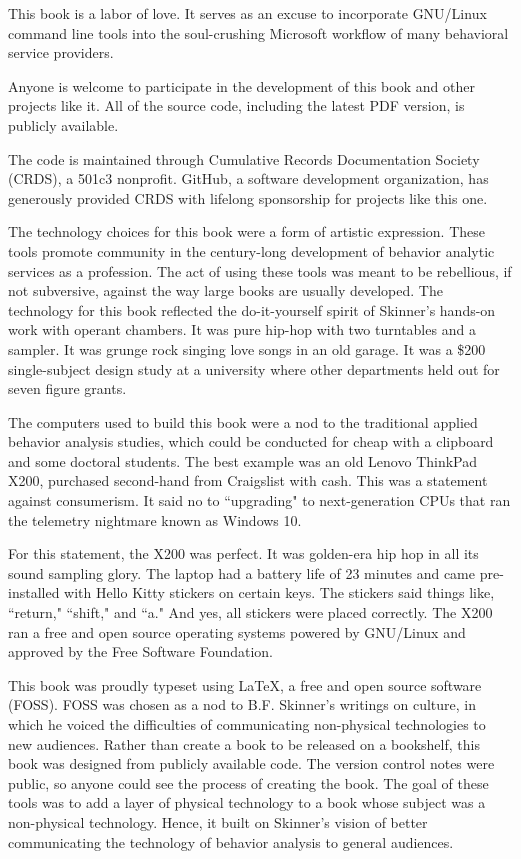 This book is a labor of love. It serves as an excuse to incorporate GNU/Linux command line tools into the soul-crushing Microsoft workflow of many behavioral service providers. 

Anyone is welcome to participate in the development of this book and other projects like it. All of the source code, including the latest PDF version, is publicly available. 

The code is maintained through Cumulative Records Documentation Society (CRDS), a 501c3 nonprofit. GitHub, a software development organization, has generously provided CRDS with lifelong sponsorship for projects like this one.

The technology choices for this book were a form of artistic expression. These tools promote community in the century-long development of behavior analytic services as a profession. The act of using these tools was meant to be rebellious, if not subversive, against the way large books are usually developed. The technology  for this book reflected the do-it-yourself spirit of Skinner's hands-on work with operant chambers. It was pure hip-hop with two turntables and a sampler. It was grunge rock singing love songs in an old garage. It was a \$200 single-subject design study at a university where other departments held out for seven figure grants.

The computers used to build this book were a nod to the traditional applied behavior analysis studies, which could be conducted for cheap with a clipboard and some doctoral students. The best example was an old Lenovo ThinkPad X200, purchased second-hand from Craigslist with cash. This was a statement against consumerism. It said no to ``upgrading" to next-generation CPUs that ran the telemetry nightmare known as Windows 10.

For this statement, the X200 was perfect. It was golden-era hip hop in all its sound sampling glory. The laptop had a battery life of 23 minutes and came pre-installed with Hello Kitty stickers on certain keys. The stickers said things like, ``return," ``shift," and ``a." And yes, all stickers were placed correctly. The X200 ran a free and open source operating systems powered by GNU/Linux and approved by the Free Software Foundation.

This book was proudly typeset using \LaTeX, a free and open source software (FOSS). FOSS was chosen as a nod to B.F. Skinner's writings on culture, in which he voiced the difficulties of communicating non-physical technologies to new audiences. Rather than create a book to be released on a bookshelf, this book was designed from publicly available code. The version control notes were public, so anyone could see the process of creating the book. The goal of these tools was to add a layer of physical technology to a book whose subject was a non-physical technology. Hence, it built on Skinner's vision of better communicating the technology of behavior analysis to general audiences.

